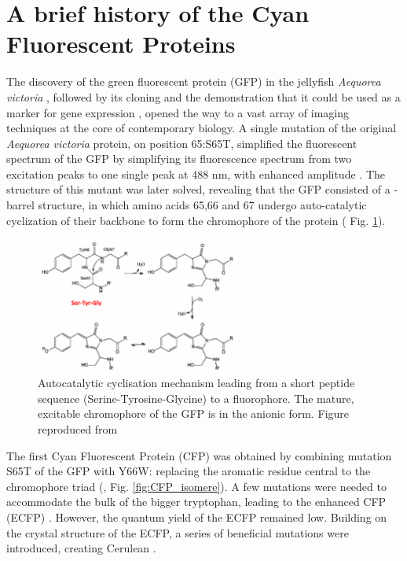\section{A brief history of the Cyan Fluorescent Proteins}\label{sec:prior_T-Cer}
The discovery of the green fluorescent protein (GFP) in the jellyfish \textit{Aequorea victoria} \parencite{shimomuraExtractionPurificationProperties1962}, followed by its cloning \parencite{prasherPrimaryStructureAequorea1992} and the demonstration that it could be used as a marker for gene expression \parencite{chalfieGreenFluorescentProtein1994}, opened the way to a vast array of imaging techniques at the core of contemporary biology. A single mutation of the original \textit{Aequorea victoria}  protein, on position 65:S65T, simplified the fluorescent spectrum of the GFP by simplifying its fluorescence spectrum from two excitation peaks to one single peak at 488 nm, with enhanced amplitude \parencite{heimImprovedGreenFluorescence1995}. The structure of this mutant was later solved, revealing that the GFP consisted of a \textbeta-barrel structure, in which amino acids 65,66 and 67 undergo auto-catalytic cyclization of their backbone to form the chromophore of the protein (\cite{ormoCrystalStructureAequorea1996} Fig. \ref{fig:FP_chromo}).
\begin{figure}[ht] %
    \centering
    \noindent \includegraphics[width=0.6\textwidth]{images/T-Cer/GFP_autocatalytic_cyclisation.pdf}
    \hfill
    \caption{Autocatalytic cyclisation mechanism leading from a short peptide sequence (Serine-Tyrosine-Glycine) to a fluorophore. The mature, excitable chromophore of the GFP is in the anionic form. Figure reproduced from \cite{cannonRedoxSensitiveGreenFluorescent2009}}
    \label{fig:FP_chromo}
\end{figure}
The first Cyan Fluorescent Protein (CFP) was obtained by combining mutation S65T of the GFP with Y66W: replacing the aromatic residue central to the chromophore triad (\cite{heimWavelengthMutationsPosttranslational1994}, Fig. \ref{fig:CFP_isomere}). A few mutations were needed to accommodate the bulk of the bigger tryptophan, leading to the enhanced CFP (ECFP) \parencite{heimWavelengthMutationsPosttranslational1994}. However, the quantum yield of the ECFP remained low. Building on the crystal structure of the ECFP, a series of beneficial mutations were introduced, creating Cerulean \parencite{rizzoImprovedCyanFluorescent2004}. 

